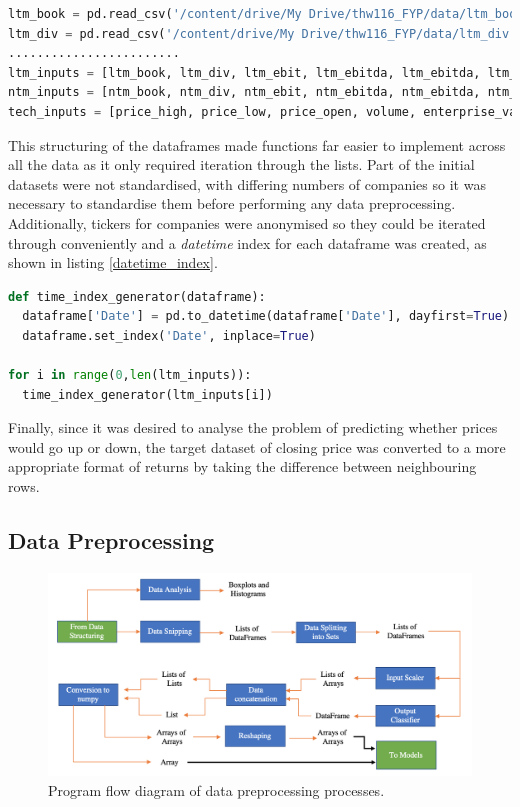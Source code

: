 \documentclass[10pt,onecolumn,letterpaper]{article}
\begin{document}
\begin{lstlisting}[language=Python, breaklines=true, caption=Formation of lists of dataframes according to type of input.]
ltm_book = pd.read_csv('/content/drive/My Drive/thw116_FYP/data/ltm_book.csv')
ltm_div = pd.read_csv('/content/drive/My Drive/thw116_FYP/data/ltm_div.csv')
........................
ltm_inputs = [ltm_book, ltm_div, ltm_ebit, ltm_ebitda, ltm_ebitda, ltm_eps, ltm_fcf, ltm_pbook, ltm_sales] 
ntm_inputs = [ntm_book, ntm_div, ntm_ebit, ntm_ebitda, ntm_ebitda, ntm_eps, ntm_fcf, ntm_pbook, ntm_sales]
tech_inputs = [price_high, price_low, price_open, volume, enterprise_val]
\end{lstlisting} 

This structuring of the dataframes made functions far easier to implement across all the data as it only required iteration through the lists. Part of the initial datasets were not standardised, with differing numbers of companies so it was necessary to standardise them before performing any data preprocessing. Additionally, tickers for companies were anonymised so they could be iterated through conveniently and a \textit{datetime} index for each dataframe was created, as shown in listing \ref{datetime_index}. 

\begin{lstlisting}[language=Python, breaklines=true, label={datetime_index}, caption={Function to create datetime index for dataframes.}]
def time_index_generator(dataframe):
  dataframe['Date'] = pd.to_datetime(dataframe['Date'], dayfirst=True)
  dataframe.set_index('Date', inplace=True)

for i in range(0,len(ltm_inputs)):
  time_index_generator(ltm_inputs[i])
\end{lstlisting} 

Finally, since it was desired to analyse the problem of predicting whether prices would go up or down, the target dataset of closing price was converted to a more appropriate format of returns by taking the difference between neighbouring rows. 

\subsection{Data Preprocessing}

\begin{figure}[!hbt!]
\centering
\includegraphics[width=\columnwidth]{data_preprocessing.png}
\caption{Program flow diagram of data preprocessing processes.}
\label{data_preprocessing}
\end{figure}
\end{document}

